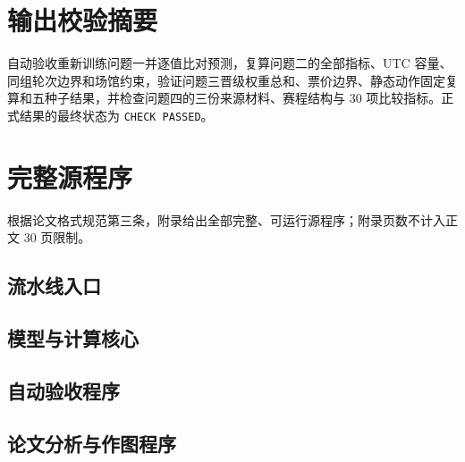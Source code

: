 \documentclass[UTF8,a4paper,11pt,fontset=none]{ctexart}
\begin{document}
\section{输出校验摘要}

自动验收重新训练问题一并逐值比对预测，复算问题二的全部指标、UTC 容量、同组轮次边界和场馆约束，验证问题三晋级权重总和、票价边界、静态动作固定复算和五种子结果，并检查问题四的三份来源材料、赛程结构与 30 项比较指标。正式结果的最终状态为 \texttt{CHECK PASSED}。

\section{完整源程序}

根据论文格式规范第三条，附录给出全部完整、可运行源程序；附录页数不计入正文 30 页限制。

\subsection{流水线入口}


\subsection{模型与计算核心}


\subsection{自动验收程序}


\subsection{论文分析与作图程序}

\end{document}
